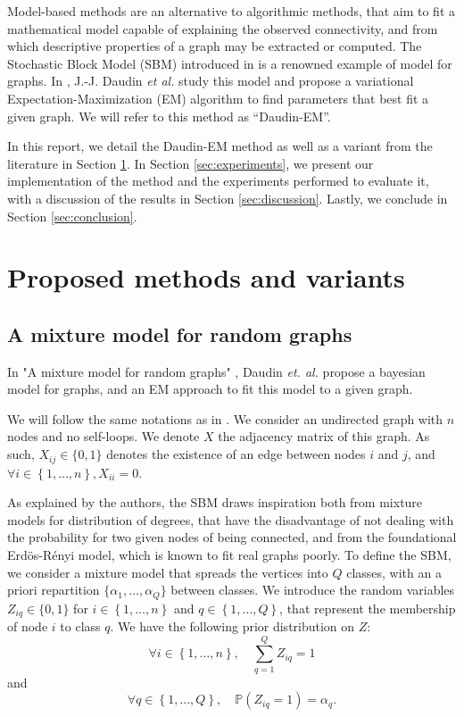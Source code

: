 \documentclass[switch, 12pt]{article}
\begin{document}
\begin{multicols}{2}
    Model-based methods are an alternative to algorithmic methods, that aim to fit a mathematical model capable of explaining the observed connectivity, and from which descriptive properties of a graph may be extracted or computed. The Stochastic Block Model (SBM) introduced in \cite{snijders_estimation_1997} is a renowned example of model for graphs. In \cite{main_article}, J.-J. Daudin \textit{et al.} study this model and propose a variational Expectation-Maximization (EM) algorithm to find parameters that best fit a given graph. We will refer to this method as ``Daudin-EM''.

    In this report, we detail the Daudin-EM method as well as a variant from the literature in Section \ref{sec:method}. In Section \ref{sec:experiments}, we present our implementation of the method and the experiments performed to evaluate it, with a discussion of the results in Section \ref{sec:discussion}. Lastly, we conclude in Section \ref{sec:conclusion}.


    \section{Proposed methods and variants}
    \label{sec:method}

    \subsection{A mixture model for random graphs}
    \label{subsec:mixture_model}
    In "A mixture model for random graphs" \cite{main_article}, Daudin \textit{et. al.} propose a bayesian model for graphs, and an EM approach to fit this model to a given graph.

    We will follow the same notations as in \cite{main_article}. We consider an undirected graph with $n$ nodes and no self-loops. We denote $X$ the adjacency matrix of this graph. As such, $X_{ij}\in \{0,1\}$ denotes the existence of an edge between nodes $i$ and $j$, and $\forall i\in \left\{1,\dots,n\right\}, X_{ii}=0$.

    As explained by the authors, the SBM draws inspiration both from mixture models for distribution of degrees, that have the disadvantage of not dealing with the probability for two given nodes of being connected, and from the foundational Erdös-Rényi model, which is known to fit real graphs poorly. To define the SBM, we consider a mixture model that spreads the vertices into $Q$ classes, with an a priori repartition $\{\alpha_1, \dots, \alpha_Q\}$ between classes. We introduce the random variables $Z_{iq} \in \{0,1\}$ for $i\in \left\{1,\dots,n\right\}$ and $q\in \left\{1,\dots,Q\right\}$, that represent the membership of node $i$ to class $q$. We have the following prior distribution on $Z$:
    \begin{equation}
        \forall i\in \left\{1,\dots,n\right\}, \quad \sum_{q=1}^Q Z_{iq} = 1
    \end{equation}
    and
    \begin{equation}
        \label{eq:prior_Z}
        \forall q\in \left\{1,\dots,Q\right\},\quad \mathbb{P}(Z_{iq}=1)=\alpha_q.
    \end{equation}


\end{multicols}
\end{document}
